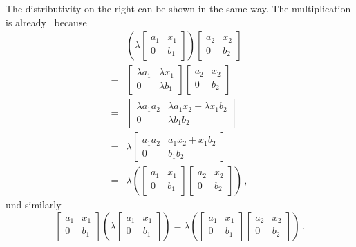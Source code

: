 The distributivity on the right can be shown in the same way.
The multiplication is already~{\kbil} because
\begin{align*}
  {}&
  \left(
    \lambda
    \begin{bmatrix}
      a_1 & x_1 \\
      0   & b_1
    \end{bmatrix}
  \right)
  \begin{bmatrix}
    a_2 & x_2 \\
    0   & b_2
  \end{bmatrix}
  \\
  ={}&
  \begin{bmatrix}
    \lambda a_1 & \lambda x_1 \\
    0           & \lambda b_1
  \end{bmatrix}
  \begin{bmatrix}
    a_2 & x_2 \\
    0   & b_2
  \end{bmatrix}
  \\
  ={}&
  \begin{bmatrix}
    \lambda a_1 a_2 & \lambda a_1 x_2 + \lambda x_1 b_2 \\
    0               & \lambda b_1 b_2
  \end{bmatrix}
  \\
  ={}&
  \lambda
  \begin{bmatrix}
    a_1 a_2 & a_1 x_2 + x_1 b_2 \\
    0       & b_1 b_2
  \end{bmatrix}
  \\
  ={}&
  \lambda
  \left(
    \begin{bmatrix}
      a_1 & x_1 \\
      0   & b_1
    \end{bmatrix}
    \begin{bmatrix}
      a_2 & x_2 \\
      0   & b_2
    \end{bmatrix}
  \right) \,,
\end{align*}
und similarly
\[
  \begin{bmatrix}
    a_1 & x_1 \\
    0   & b_1
  \end{bmatrix}
  \left(
    \lambda
    \begin{bmatrix}
      a_1 & x_1 \\
      0   & b_1
    \end{bmatrix}
  \right)
  =
  \lambda
  \left(
    \begin{bmatrix}
      a_1 & x_1 \\
      0   & b_1
    \end{bmatrix}
    \begin{bmatrix}
      a_2 & x_2 \\
      0   & b_2
    \end{bmatrix}
  \right) \,.
\]
